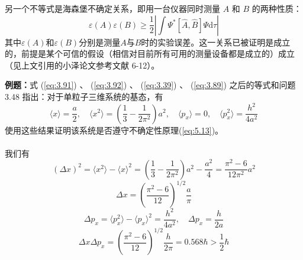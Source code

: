     另一个不等式是海森堡不确定关系，即用一台仪器同时测量 $A$ 和 $B$ 的两种性质：
    \begin{equation*}
        \varepsilon\left(A\right)\varepsilon\left(B\right) \ge \frac{1}{2}\left|\int \Psi^{\ast}\left[\hat{A},\hat{B}\right]\Psi\mathrm{d}\tau\right|
    \end{equation*}
    其中$\varepsilon\left(A\right)$和$\varepsilon\left(B\right)$分别是测量$A$与$B$时的实验误差。这一关系已被证明是成立的，前提是某个可信的假设（相信对目前所有可用的测量设备都是成立的）成立（见上文引用的小泽论文参考文献 6-12）。
    \begin{examplebox}
        \textbf{例题：}式 (\ref{eq:3.91}) 、 (\ref{eq:3.92}) 、 (\ref{eq:3.39}) 、 (\ref{eq:3.89}) 之后的等式和问题 3.48 指出：对于单粒子三维系统的基态，有
        \begin{equation*}
            \langle x \rangle = \frac{a}{2}, \quad \langle x^2 \rangle = \left(\frac{1}{3}-\frac{1}{2\pi^2}\right)a^2, \quad \langle p_x \rangle = 0, \quad \langle p_x^2 \rangle = \frac{h^2}{4a^2}
        \end{equation*}
        使用这些结果证明该系统是否遵守不确定性原理(\ref{eq:5.13})。
        \\ \\
        我们有
        \begin{equation*}
            \left(\Delta x\right)^2 = \langle x^2 \rangle - \langle x \rangle^2 = \left(\frac{1}{3}-\frac{1}{2\pi^2}\right)a^2 - \frac{a^2}{4} = \frac{\pi^2-6}{12\pi^2}a^2
        \end{equation*}
        \begin{equation*}
            \Delta x = \left(\frac{\pi^2-6}{12}\right)^{1/2}\frac{a}{\pi}
        \end{equation*}
        \begin{equation*}
            \Delta p_x = \langle p_x^2 \rangle - \langle p_x \rangle^2 = \frac{h^2}{4a^2}, \quad \Delta p_x = \frac{h}{2a}
        \end{equation*}
        \begin{equation*}
            \Delta x \Delta p_x = \left(\frac{\pi^2-6}{12}\right)^{1/2}\frac{h}{2\pi} = 0.568\hbar > \frac{1}{2}\hbar
        \end{equation*}
    \end{examplebox}


